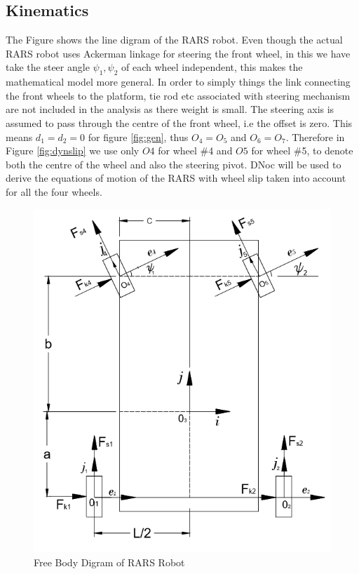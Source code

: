 {\subsection{Kinematics}
\label{sec:slipKina}
The Figure shows the line digram of the RARS robot. Even though the actual RARS robot uses Ackerman linkage for steering the front wheel, in this we have take the steer angle $\psi_1,\psi_2$ of each wheel independent, this makes the mathematical  model more general. In order to simply things the  link connecting the front wheels to the platform, tie rod etc associated with steering mechanism   are not included in the analysis as there weight is small. The steering axis is assumed to pass through the centre of the front wheel, i.e the offset is zero.  This means $d_1=d_2=0$  for figure \ref{fig:gen}, thus $O_4=O_5$ and $O_6=O_7$. Therefore in Figure \ref{fig:dynslip} we use only $O4$  for wheel \#4 and $O5$ for wheel \#5, to denote both the centre of the wheel and also the steering pivot. DNoc will be used to derive the equations of motion of the RARS with wheel slip taken into account for all the four wheels.
\begin{figure}
	\label{fig:VehicleWithSlip}
	\includegraphics[width=\linewidth]{Chapter4/fig/VechileWithSlip}
	\caption{Free Body Digram of RARS Robot}
\end{figure}

}
